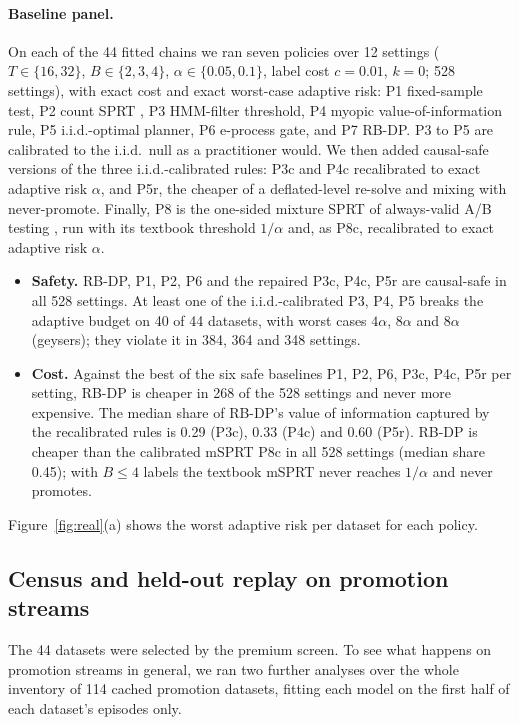 \documentclass{article}
\theoremstyle{plain}
\theoremstyle{definition}
\theoremstyle{remark}
\begin{document}
\paragraph{Baseline panel.} On each of the 44 fitted chains we ran seven policies over 12 settings ($T\in\{16,32\}$, $B\in\{2,3,4\}$, $\alpha\in\{0.05,0.1\}$, label cost $c=0.01$, $k=0$; 528 settings), with exact cost and exact worst-case adaptive risk: P1 fixed-sample test, P2 count SPRT \citep{wald1945sequential}, P3 HMM-filter threshold, P4 myopic value-of-information rule, P5 i.i.d.-optimal planner, P6 e-process gate, and P7 RB-DP. P3 to P5 are calibrated to the i.i.d.\ null as a practitioner would. We then added causal-safe versions of the three i.i.d.-calibrated rules: P3c and P4c recalibrated to exact adaptive risk $\alpha$, and P5r, the cheaper of a deflated-level re-solve and mixing with never-promote. Finally, P8 is the one-sided mixture SPRT of always-valid A/B testing \citep{johari2022always}, run with its textbook threshold $1/\alpha$ and, as P8c, recalibrated to exact adaptive risk $\alpha$.

\begin{itemize}
\item \textbf{Safety.} RB-DP, P1, P2, P6 and the repaired P3c, P4c, P5r are causal-safe in all 528 settings. At least one of the i.i.d.-calibrated P3, P4, P5 breaks the adaptive budget on 40 of 44 datasets, with worst cases $4\alpha$, $8\alpha$ and $8\alpha$ (geysers); they violate it in 384, 364 and 348 settings.
\item \textbf{Cost.} Against the best of the six safe baselines P1, P2, P6, P3c, P4c, P5r per setting, RB-DP is cheaper in 268 of the 528 settings and never more expensive. The median share of RB-DP's value of information captured by the recalibrated rules is 0.29 (P3c), 0.33 (P4c) and 0.60 (P5r). RB-DP is cheaper than the calibrated mSPRT P8c in all 528 settings (median share 0.45); with $B\le4$ labels the textbook mSPRT never reaches $1/\alpha$ and never promotes.
\end{itemize}
Figure~\ref{fig:real}(a) shows the worst adaptive risk per dataset for each policy.


\subsection{Census and held-out replay on promotion streams}

The 44 datasets were selected by the premium screen. To see what happens on promotion streams in general, we ran two further analyses over the whole inventory of 114 cached promotion datasets, fitting each model on the first half of each dataset's episodes only.
\end{document}
